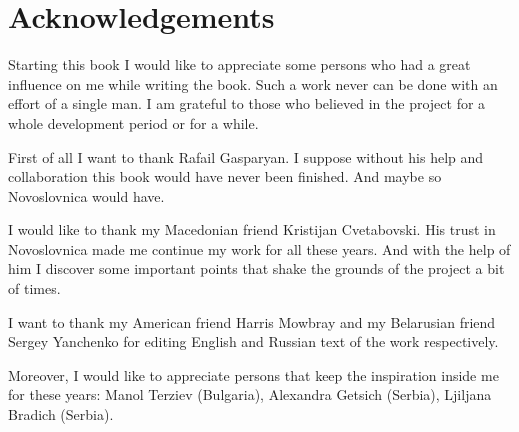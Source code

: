 \chapter{Acknowledgements}

Starting this book I would like to appreciate some persons who had a great influence on me while writing the book. Such a work never can be done with an effort of a single man. I am grateful to those who believed in the project for a whole development period or for a while.

First of all I want to thank Rafail Gasparyan. I suppose without his help and collaboration this book would have never been finished. And maybe so Novoslovnica would have.

I would like to thank my Macedonian friend Kristijan Cvetabovski. His trust in Novoslovnica made me continue my work for all these years. And with the help of him I discover some important points that shake the grounds of the project a bit of times.

I want to thank my American friend Harris Mowbray and my Belarusian friend Sergey Yanchenko for editing English and Russian text of the work respectively.

Moreover, I would like to appreciate persons that keep the inspiration inside me for these years: Manol Terziev (Bulgaria), Alexandra Getsich (Serbia), Ljiljana Bradich (Serbia).
